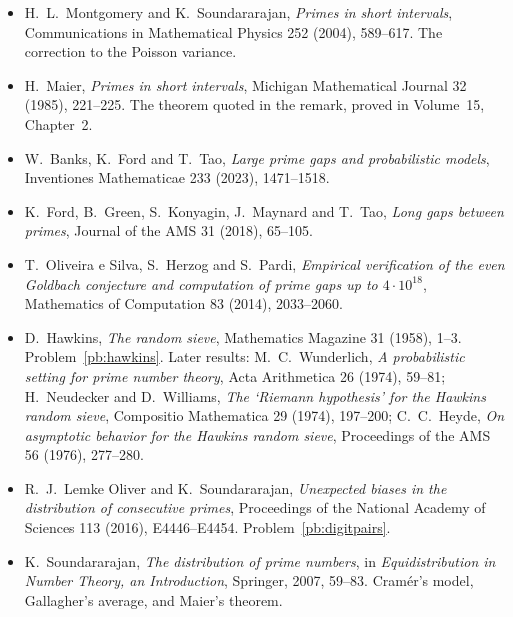 \begin{itemize}
\item H.~L.~Montgomery and K.~Soundararajan, \emph{Primes in short intervals}, Communications in Mathematical Physics 252 (2004), 589--617. The correction to the Poisson variance.
\item H.~Maier, \emph{Primes in short intervals}, Michigan Mathematical Journal 32 (1985), 221--225. The theorem quoted in the remark, proved in Volume~15, Chapter~2.
\item W.~Banks, K.~Ford and T.~Tao, \emph{Large prime gaps and probabilistic models}, Inventiones Mathematicae 233 (2023), 1471--1518.
\item K.~Ford, B.~Green, S.~Konyagin, J.~Maynard and T.~Tao, \emph{Long gaps between primes}, Journal of the AMS 31 (2018), 65--105.
\item T.~Oliveira e Silva, S.~Herzog and S.~Pardi, \emph{Empirical verification of the even Goldbach conjecture and computation of prime gaps up to $4\cdot10^{18}$}, Mathematics of Computation 83 (2014), 2033--2060.
\item D.~Hawkins, \emph{The random sieve}, Mathematics Magazine 31 (1958), 1--3. Problem~\ref{pb:hawkins}. Later results: M.~C.~Wunderlich, \emph{A probabilistic setting for prime number theory}, Acta Arithmetica 26 (1974), 59--81; H.~Neudecker and D.~Williams, \emph{The `Riemann hypothesis' for the Hawkins random sieve}, Compositio Mathematica 29 (1974), 197--200; C.~C.~Heyde, \emph{On asymptotic behavior for the Hawkins random sieve}, Proceedings of the AMS 56 (1976), 277--280.
\item R.~J.~Lemke Oliver and K.~Soundararajan, \emph{Unexpected biases in the distribution of consecutive primes}, Proceedings of the National Academy of Sciences 113 (2016), E4446--E4454. Problem~\ref{pb:digitpairs}.
\item K.~Soundararajan, \emph{The distribution of prime numbers}, in \emph{Equidistribution in Number Theory, an Introduction}, Springer, 2007, 59--83. Cramér's model, Gallagher's average, and Maier's theorem.
\end{itemize}
